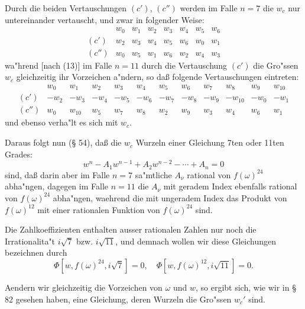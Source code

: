 \documentclass[12pt,a4paper]{article}
\theoremstyle{plain}
\theoremstyle{definition}
\theoremstyle{remark}
\begin{document}
Durch die beiden Vertauschungen $(c')$, $(c'')$ werden im Falle $n = 7$ die $w_c$ nur untereinander vertauscht, und zwar in folgender Weise:
\begin{equation}\label{eq:133_16}
\begin{array}{c|ccccccc}
 & w_0 & w_1 & w_2 & w_3 & w_4 & w_5 & w_6 \\ \hline
(c') & w_2 & w_3 & w_4 & w_5 & w_6 & w_0 & w_1 \\
(c'')& w_0 & w_5 & w_1 & w_6 & w_2 & w_4 & w_3
\end{array}
\end{equation}
wa"hrend [nach (13)] im Falle $n = 11$ durch die Vertauschung $(c')$ die Gro"ssen $w_c$ gleichzeitig ihr Vorzeichen a"ndern, so da\ss{} folgende Vertauschungen eintreten:
\[
\begin{array}{c|ccccccccccc}
 & w_0 & w_1 & w_2 & w_3 & w_4 & w_5 & w_6 & w_7 & w_8 & w_9 & w_{10} \\ \hline
(c') & -w_2 & -w_3 & -w_4 & -w_5 & -w_6 & -w_7 & -w_8 & -w_9 & -w_{10} & -w_0 & -w_1 \\
(c'')& w_0 & w_{10} & w_5 & w_7 & w_8 & w_2 & w_9 & w_3 & w_4 & w_6 & w_1
\end{array}
\]
und ebenso verha"lt es sich mit $w_c$.

Daraus folgt nun (\S{} 54), da\ss{} die $w_c$ Wurzeln einer Gleichung 7ten oder 11ten Grades:
\begin{equation}\label{eq:133_16b}
w^n - A_1 w^{n-1} + A_2 w^{n-2} - \cdots + A_n = 0
\end{equation}
sind, da\ss{} darin aber im Falle $n = 7$ sa"mtliche $A_\nu$ rational von $f(\omega)^{24}$ abha"ngen, dagegen im Falle $n = 11$ die $A_\nu$ mit geradem Index ebenfalls rational von $f(\omega)^{24}$ abha"ngen, waehrend die mit ungeradem Index das Produkt von $f(\omega)^{12}$ mit einer rationalen Funktion von $f(\omega)^{24}$ sind.

Die Zahlkoeffizienten enthalten ausser rationalen Zahlen nur noch die Irrationalita"t $i\sqrt{7}$ bzw. $i\sqrt{11}$, und demnach wollen wir diese Gleichungen bezeichnen durch
\begin{equation}\label{eq:133_17}
\Phi[w, f(\omega)^{24}, i\sqrt{7}] = 0, \quad \Phi[w, f(\omega)^{12}, i\sqrt{11}] = 0.
\end{equation}

Aendern wir gleichzeitig die Vorzeichen von $\omega$ und $w$, so ergibt sich, wie wir in \S{} 82 gesehen haben, eine Gleichung, deren Wurzeln die Gro"ssen $w_c'$ sind.
\end{document}
